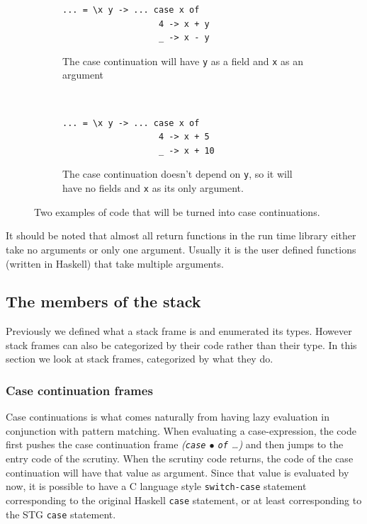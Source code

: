 \begin{figure}
\begin{mdframed}
        \begin{subfigure}[t]{0.5\textwidth}
          \begin{verbatim}
... = \x y -> ... case x of
                   4 -> x + y
                   _ -> x - y
          \end{verbatim}
          \caption{The case continuation will have \texttt{y} as a field
and \texttt{x} as an argument}
        \end{subfigure}
    ~ %
        \begin{subfigure}[t]{0.5\textwidth}
          \begin{verbatim}
... = \x y -> ... case x of
                   4 -> x + 5
                   _ -> x + 10
          \end{verbatim}
          \caption{The case continuation doesn't depend on \texttt{y},
so it will have no fields and \texttt{x} as its only argument.}
        \end{subfigure}
  \caption{Two examples of code that will be turned into case
continuations.}
  \label{fig:field_and_arguments}
\end{mdframed}
\end{figure}

It should be noted that almost all return functions in the run time library
either take no arguments or only one argument.
Usually it is the user defined functions (written in Haskell)
that take multiple arguments.

\subsection{The members of the stack} \label{sec:members_of_stack}

Previously we defined what a stack frame is and enumerated
its types. However stack frames can also be categorized by their
code rather than their type. In this
section we look at stack frames, categorized by what they do.

\subsubsection{Case continuation frames}

Case continuations is what comes naturally from having lazy evaluation
in conjunction with pattern matching. When evaluating a case-expression, the code first
pushes the case continuation frame \emph{(\texttt{case} $\bullet$ \texttt{of}
\dots)} and then jumps to the entry code of the scrutiny. When the
scrutiny code returns, the code of the case continuation will have
that value as argument. Since that value is evaluated by now, it is
possible to have a C language style \texttt{switch-case} statement
corresponding to the original Haskell \texttt{case} statement,
or at least corresponding to the STG \texttt{case} statement.

